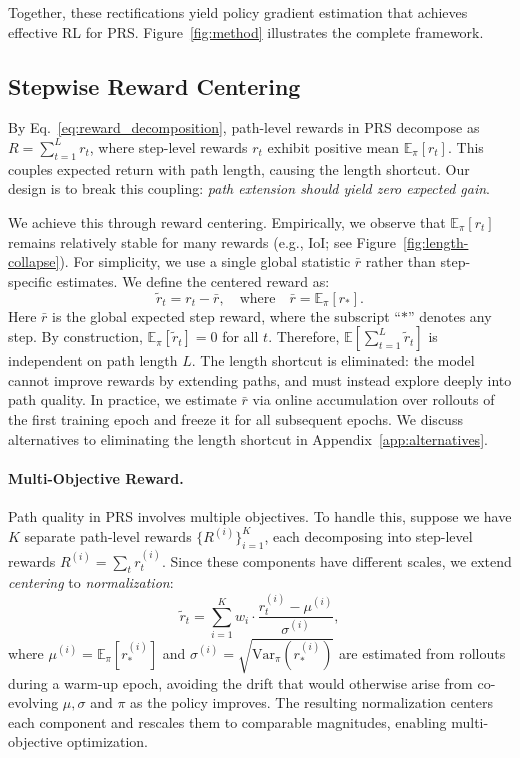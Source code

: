 Together, these rectifications yield policy gradient estimation that achieves effective RL for PRS. Figure~\ref{fig:method} illustrates the complete framework.

\subsection{Stepwise Reward Centering}
\label{sec:centering}

By Eq.~\eqref{eq:reward_decomposition}, path-level rewards in PRS decompose as $R = \sum_{t=1}^{L} r_t$, where step-level rewards $r_t$ exhibit positive mean $\mathbb{E}_\pi[r_t]$. This couples expected return with path length, causing the length shortcut. Our design is to break this coupling: \emph{path extension should yield zero expected gain}.

We achieve this through reward centering. Empirically, we observe that $\mathbb{E}_{\pi}[r_t]$ remains relatively stable for many rewards (e.g., IoI; see Figure~\ref{fig:length-collapse}). For simplicity, we use a single global statistic $\bar{r}$ rather than 
step-specific estimates. We define the centered reward as: 
\begin{equation}
\tilde{r}_t = r_t - \bar{r}, \quad \text{where} \quad \bar{r} = \mathbb{E}_{\pi}\left[r_*\right].
\label{eq:centering}
\end{equation}
Here $\bar{r}$ is the global expected step reward, where the subscript ``$*$'' denotes any step. By construction, $\mathbb{E}_{\pi}[\tilde{r}_t] = 0$ for all $t$. Therefore, $\mathbb{E}\left[\sum_{t=1}^{L} \tilde{r}_t\right]$ is independent on path length $L$. The length shortcut is eliminated: the model cannot improve rewards by extending paths, and must instead explore deeply into path quality. In practice, we estimate $\bar{r}$ via online accumulation over rollouts of the first training epoch and freeze it for all subsequent epochs. We discuss alternatives to eliminating the length shortcut in Appendix~\ref{app:alternatives}.

\paragraph{Multi-Objective Reward.} Path quality in PRS involves multiple objectives. To handle this, suppose we have $K$ separate path-level rewards $\{R^{(i)}\}_{i=1}^{K}$, each decomposing into step-level rewards $R^{(i)}=\sum_t r_t^{(i)}$. Since these components have different scales, we extend \emph{centering} to \emph{normalization}:
\begin{equation}
\tilde{r}_t = \sum_{i=1}^{K} w_i \cdot \frac{r_t^{(i)} - \mu^{(i)}}{\sigma^{(i)}},
\label{eq:reward-normalize}
\end{equation}
where $\mu^{(i)} = \mathbb{E}_{\pi}\left[r_*^{(i)}\right]$ and $\sigma^{(i)} = \sqrt{\mathrm{Var}_{\pi}\left(r_*^{(i)}\right)}$ are estimated from rollouts during a warm-up epoch, avoiding the drift that would otherwise arise from co-evolving $\mu, \sigma$ and $\pi$ as the policy improves. The resulting normalization centers each component and rescales them to comparable magnitudes, enabling multi-objective optimization.

